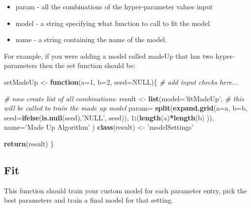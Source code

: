 \documentclass[
]{article}
\newenvironment{Shaded}{\begin{snugshade}}{\end{snugshade}}
\newcommand{\CommentTok}[1]{\textcolor[rgb]{0.56,0.35,0.01}{\textit{#1}}}
\newcommand{\ControlFlowTok}[1]{\textcolor[rgb]{0.13,0.29,0.53}{\textbf{#1}}}
\newcommand{\DataTypeTok}[1]{\textcolor[rgb]{0.13,0.29,0.53}{#1}}
\newcommand{\DecValTok}[1]{\textcolor[rgb]{0.00,0.00,0.81}{#1}}
\newcommand{\KeywordTok}[1]{\textcolor[rgb]{0.13,0.29,0.53}{\textbf{#1}}}
\newcommand{\NormalTok}[1]{#1}
\newcommand{\OperatorTok}[1]{\textcolor[rgb]{0.81,0.36,0.00}{\textbf{#1}}}
\newcommand{\OtherTok}[1]{\textcolor[rgb]{0.56,0.35,0.01}{#1}}
\newcommand{\StringTok}[1]{\textcolor[rgb]{0.31,0.60,0.02}{#1}}
\providecommand{\tightlist}{%
  \setlength{\itemsep}{0pt}\setlength{\parskip}{0pt}}
\begin{document}
\begin{itemize}
\tightlist
\item
  param - all the combinations of the hyper-parameter values input
\item
  model - a string specifying what function to call to fit the model
\item
  name - a string containing the name of the model.
\end{itemize}

For example, if you were adding a model called madeUp that has two
hyper-parameters then the set function should be:

\begin{Shaded}
\begin{Highlighting}[]
\NormalTok{setMadeUp <-}\StringTok{ }\ControlFlowTok{function}\NormalTok{(}\DataTypeTok{a=}\DecValTok{1}\NormalTok{, }\DataTypeTok{b=}\DecValTok{2}\NormalTok{, }\DataTypeTok{seed=}\OtherTok{NULL}\NormalTok{)\{}
  \CommentTok{# add input checks here...}
  
  \CommentTok{# now create list of all combinations:}
\NormalTok{  result <-}\StringTok{ }\KeywordTok{list}\NormalTok{(}\DataTypeTok{model=}\StringTok{'fitMadeUp'}\NormalTok{, }\CommentTok{# this will be called to train the made up model}
                 \DataTypeTok{param=} \KeywordTok{split}\NormalTok{(}\KeywordTok{expand.grid}\NormalTok{(}\DataTypeTok{a=}\NormalTok{a, }
                                          \DataTypeTok{b=}\NormalTok{b,}
                                          \DataTypeTok{seed=}\KeywordTok{ifelse}\NormalTok{(}\KeywordTok{is.null}\NormalTok{(seed),}\StringTok{'NULL'}\NormalTok{, seed)),}
                              \DecValTok{1}\OperatorTok{:}\NormalTok{(}\KeywordTok{length}\NormalTok{(a)}\OperatorTok{*}\KeywordTok{length}\NormalTok{(b)  )),}
                 \DataTypeTok{name=}\StringTok{'Made Up Algorithm'}
\NormalTok{  )}
  \KeywordTok{class}\NormalTok{(result) <-}\StringTok{ 'modelSettings'} 
  
  \KeywordTok{return}\NormalTok{(result)}
\NormalTok{\}}
\end{Highlighting}
\end{Shaded}

\hypertarget{fit}{%
\subsection{Fit}\label{fit}}

This function should train your custom model for each parameter entry,
pick the best parameters and train a final model for that setting.
\end{document}

